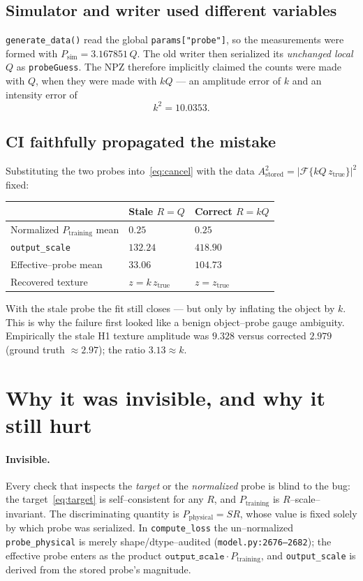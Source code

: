 \documentclass[11pt]{article}
\newcommand{\Astored}{A_{\mathrm{stored}}}
\newcommand{\Pphys}{P_{\mathrm{physical}}}
\newcommand{\Ptrain}{P_{\mathrm{training}}}
\newcommand{\Psim}{P_{\mathrm{sim}}}
\newcommand{\code}[1]{\texttt{#1}}
\begin{document}
\subsection{Simulator and writer used different variables}

\code{generate\_data()} read the global \code{params["probe"]}, so the
measurements were formed with $\Psim = 3.167851\,Q$. The old writer then
serialized its \emph{unchanged local} $Q$ as \code{probeGuess}. The NPZ
therefore implicitly claimed the counts were made with $Q$, when they were made
with $kQ$ --- an amplitude error of $k$ and an intensity error of
\begin{equation}
k^2 = 10.0353 .
\end{equation}

\subsection{CI faithfully propagated the mistake}

Substituting the two probes into~\eqref{eq:cancel} with the data
$\Astored^2 = |\mathcal{F}\{kQ\,z_{\mathrm{true}}\}|^2$ fixed:
\begin{center}
\begin{tabular}{lll}
\toprule
& \textbf{Stale } $R=Q$ & \textbf{Correct } $R=kQ$ \\
\midrule
Normalized $\Ptrain$ mean & $0.25$ & $0.25$ \\
\code{output\_scale}      & $132.24$ & $418.90$ \\
Effective--probe mean     & $33.06$  & $104.73$ \\
Recovered texture         & $z = k\,z_{\mathrm{true}}$ & $z = z_{\mathrm{true}}$ \\
\bottomrule
\end{tabular}
\end{center}
With the stale probe the fit still closes --- but only by inflating the object
by $k$. This is why the failure first looked like a benign object--probe gauge
ambiguity. Empirically the stale H1 texture amplitude was $9.328$ versus
corrected $2.979$ (ground truth $\approx 2.97$); the ratio $3.13 \approx k$.

\section{Why it was invisible, and why it still hurt}

\paragraph{Invisible.} Every check that inspects the \emph{target} or the
\emph{normalized} probe is blind to the bug: the target~\eqref{eq:target} is
self--consistent for any $R$, and $\Ptrain$ is $R$--scale--invariant. The
discriminating quantity is $\Pphys = SR$, whose value is fixed solely by which
probe was serialized. In \code{compute\_loss} the un--normalized
\code{probe\_physical} is merely shape/dtype--audited
(\code{model.py:2676--2682}); the effective probe enters as the product
$\code{output\_scale}\cdot\Ptrain$, and \code{output\_scale} is derived from the
stored probe's magnitude.
\end{document}
